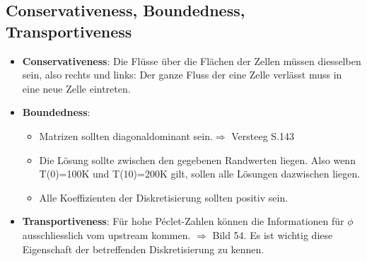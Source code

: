 \documentclass[a4paper]{scrartcl}
\begin{document}
\subsection{Conservativeness, Boundedness, Transportiveness}
\begin{itemize}
  \item \textbf{Conservativeness}: Die Flüsse über die Flächen der Zellen
  müssen diesselben sein, also rechts und links: Der ganze Fluss der eine Zelle
  verlässt muss in eine neue Zelle eintreten.
  \item \textbf{Boundedness}: 
  \begin{itemize}
    \item Matrizen sollten diagonaldominant sein.$\Rightarrow$ Versteeg S.143
    \item Die Lösung sollte zwischen den gegebenen Randwerten liegen. Also wenn
    T(0)=100K und T(10)=200K gilt, sollen alle Lösungen dazwischen liegen.
    \item Alle Koeffizienten der Diskretisierung sollten positiv sein.
	\end{itemize}
   \item \textbf{Transportiveness}: Für hohe Péclet-Zahlen können die
   Informationen für $\phi$ ausschliesslich vom upstream kommen. $\Rightarrow$
   Bild 54. Es ist wichtig diese Eigenschaft der betreffenden Diskretisierung zu
   kennen.
\end{itemize}
\end{document}
